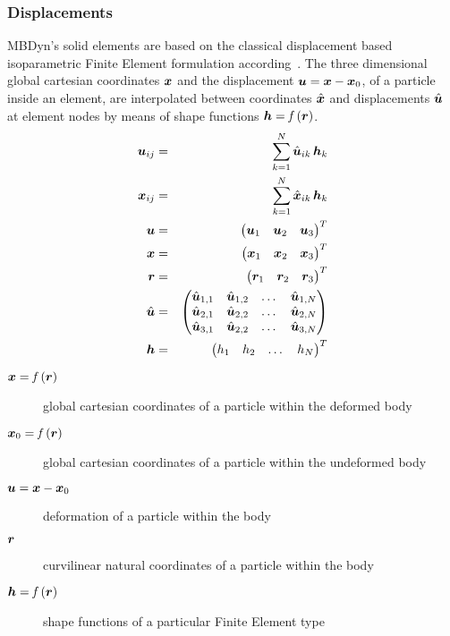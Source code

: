 \subsubsection{Displacements}
MBDyn's solid elements are based on the classical displacement based isoparametric Finite Element formulation according~\cite{BATHE2016}.
The three dimensional global cartesian coordinates $\bm{x}$ and the displacement $\bm{u}=\bm{x}-\bm{x}_0$, of a particle inside an element,
are interpolated between coordinates $\hat{\bm{x}}$ and displacements $\hat{\bm{u}}$ at element nodes by means of shape functions $\bm{h}=\mathit{f}\left(\bm{r}\right)$.
\begin{eqnarray}
  \bm{u}_{ij} &=& \sum_{k=1}^N\hat{\bm{u}}_{ik} \,\bm{h}_{k} \\
  \bm{x}_{ij} &=& \sum_{k=1}^N\hat{\bm{x}}_{ik} \,\bm{h}_{k} \\
  \bm{u} &=& \begin{pmatrix} \bm{u}_1 & \bm{u}_2 & \bm{u}_3 \end{pmatrix}^T \\
  \bm{x} &=& \begin{pmatrix} \bm{x}_1 & \bm{x}_2 & \bm{x}_3 \end{pmatrix}^T \\
  \bm{r} &=& \begin{pmatrix} \bm{r}_1 & \bm{r}_2 & \bm{r}_3 \end{pmatrix}^T \\
  \hat{\bm{u}} &=& \begin{pmatrix}
    \hat{\bm{u}}_{1,1} & \hat{\bm{u}}_{1,2} & \ldots{} & \hat{\bm{u}}_{1,N} \\
    \hat{\bm{u}}_{2,1} & \hat{\bm{u}}_{2,2} & \ldots{} & \hat{\bm{u}}_{2,N} \\
    \hat{\bm{u}}_{3,1} & \hat{\bm{u}}_{2,2} & \ldots{} & \hat{\bm{u}}_{3,N}
  \end{pmatrix} \\
  \bm{h} & = & \begin{pmatrix}
    h_1 & h_2 & \ldots{} & h_N
  \end{pmatrix}^T
\end{eqnarray}

\begin{description}
\item[$\bm{x}=\mathit{f}\left(\bm{r}\right)$] global cartesian coordinates of a particle within the deformed body
\item[$\bm{x}_0=\mathit{f}\left(\bm{r}\right)$] global cartesian coordinates of a particle within the undeformed body
\item[$\bm{u}=\bm{x}-\bm{x}_0$] deformation of a particle within the body
\item[$\bm{r}$] curvilinear natural coordinates of a particle within the body
\item[$\bm{h}=\mathit{f}\left(\bm{r}\right)$] shape functions of a particular Finite Element type
\end{description}

